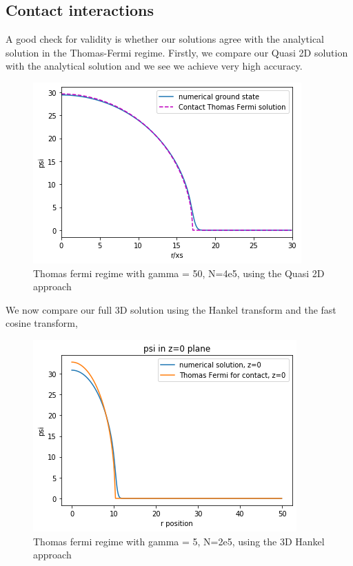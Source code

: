 \documentclass[10pt]{article}
\numberwithin{equation}{section}
\begin{document}
\begin{multicols}{2}
\section{Contact interactions}
A good check for validity is whether our solutions agree with the analytical solution in the Thomas-Fermi regime. Firstly, we compare our Quasi 2D solution with the analytical solution and we see we achieve very high accuracy.

 
\begin{figure}[H]
\centering
\includegraphics[width=0.8\linewidth]{ContactThomasFermiQuasi 2DHankelgamma=50No=4e5}
\caption{Thomas fermi regime with gamma = 50, N=4e5, using the Quasi 2D approach}
\end{figure}

We now compare our full 3D solution using the Hankel transform and the fast cosine transform, 

\begin{figure}[H]
\centering
\includegraphics[width=0.8\linewidth]{Contact Thomas Fermi 3D Hankel gamma=5 No=2e5}
\caption{Thomas fermi regime with gamma = 5, N=2e5, using the 3D Hankel approach}
\end{figure}


\end{multicols}
\end{document}
